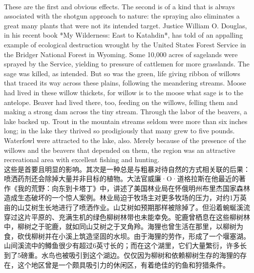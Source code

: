 \documentclass{article}
\begin{document}
\\
These are the first and obvious effects. The second is of a kind that is always associated with the shotgun approach to nature: the spraying also eliminates a great many plants that were not its intended target. Justice William O. Douglas, in his recent book *My Wilderness: East to Katahdin*, has told of an appalling example of ecological destruction wrought by the United States Forest Service in the Bridger National Forest in Wyoming. Some 10,000 acres of sagelands were sprayed by the Service, yielding to pressure of cattlemen for more grasslands. The sage was killed, as intended. But so was the green, life giving ribbon of willows that traced its way across these plains, following the meandering streams. Moose had lived in these willow thickets, for willow is to the moose what sage is to the antelope. Beaver had lived there, too, feeding on the willows, felling them and making a strong dam across the tiny stream. Through the labor of the beavers, a lake backed up. Trout in the mountain streams seldom were more than six inches long; in the lake they thrived so prodigiously that many grew to five pounds. Waterfowl were attracted to the lake, also. Merely because of the presence of the willows and the beavers that depended on them, the region was an attractive recreational area with excellent fishing and hunting.\\
这些是首要且明显的影响。其次是一种总是与粗暴对待自然的方式相关联的后果：喷洒药剂还会除掉大量并非目标的植物。大法官威廉·O·道格拉斯在他最近的著作《我的荒野：向东到卡塔丁》中，讲述了美国林业局在怀俄明州布里杰国家森林造成生态破坏的一个惊人案例。林业局迫于牧场主对更多牧场的压力，对约1万英亩的山艾树生长地进行了喷洒作业。山艾树如预期那样被除掉了。但沿着蜿蜒溪流穿过这片平原的、充满生机的绿色柳树林带也未能幸免。驼鹿曾栖息在这些柳树林中，柳树之于驼鹿，就如同山艾树之于叉角羚。海狸也曾生活在那里，以柳树为食，砍伐柳树并在小溪上筑造坚固的水坝。由于海狸的劳作，形成了一个堰塞湖。山间溪流中的鳟鱼很少有超过6英寸长的；而在这个湖里，它们大量繁衍，许多长到了5磅重。水鸟也被吸引到这个湖边。仅仅因为柳树和依赖柳树生存的海狸的存在，这个地区曾是一个颇具吸引力的休闲区，有着绝佳的钓鱼和狩猎条件。 \\
\end{document}

